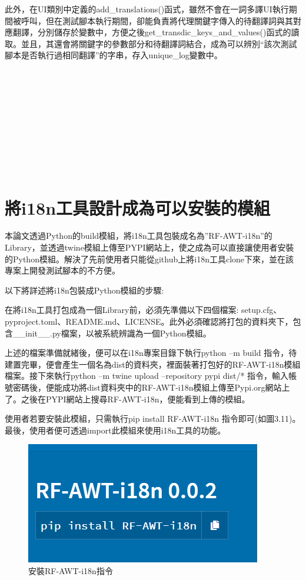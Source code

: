 此外，在UI類別中定義的add\_translations()函式，雖然不會在一詞多譯UI執行期間被呼叫，但在測試腳本執行期間，卻能負責將代理關鍵字傳入的待翻譯詞與其對應翻譯，分別儲存於變數中，方便之後get\_transdic\_keys\_and\_values()函式的讀取。並且，其還會將關鍵字的參數部分和待翻譯詞結合，成為可以辨別“該次測試腳本是否執行過相同翻譯”的字串，存入unique\_log變數中。

\hspace*{\fill} \\
\\ \hspace*{\fill} \\
\\ \hspace*{\fill} \\
\\ \hspace*{\fill} \\
\\ \hspace*{\fill} \\
\section{將i18n工具設計成為可以安裝的模組}
本論文透過Python的build模組，將i18n工具包裝成名為”RF-AWT-i18n”的Library，並透過twine模組上傳至PYPI\cite{PYPI}網站上，使之成為可以直接讓使用者安裝的Python模組。解決了先前使用者只能從github上將i18n工具clone下來，並在該專案上開發測試腳本的不方便。

以下將詳述將i18n包裝成Python模組的步驟:

在將i18n工具打包成為一個Library前，必須先準備以下四個檔案: setup.cfg、pyproject.toml、README.md、LICENSE\cite{license}。此外必須確認將打包的資料夾下，包含\_\_init\_\_.py檔案，以被系統辨識為一個Python模組。

上述的檔案準備就緒後，便可以在i18n專案目錄下執行python –m build 指令，待建置完畢，便會產生一個名為dist的資料夾，裡面裝著打包好的RF-AWT-i18n模組檔案。接下來執行python –m twine upload –repository pypi dist/* 指令，輸入帳號密碼後，便能成功將dist資料夾中的RF-AWT-i18n模組上傳至Pypi.org網站上了。之後在PYPI網站上搜尋RF-AWT-i18n，便能看到上傳的模組。

使用者若要安裝此模組，只需執行pip install RF-AWT-i18n 指令即可(如圖3.11)。最後，使用者便可透過import此模組來使用i18n工具的功能。

\begin{figure}[H]
    \centering
    \includegraphics[width= .5\textwidth]{../論文截圖/3-5-8 安裝RF-AWT-i18n指令.png}
    \caption{安裝RF-AWT-i18n指令}
\end{figure}